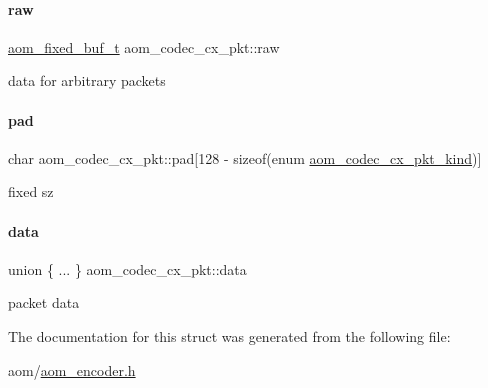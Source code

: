 \paragraph{\texorpdfstring{raw}{raw}}
{\footnotesize\ttfamily \hyperlink{group__encoder_ga85cca9fad6bc25c667f013a39c607174}{aom\+\_\+fixed\+\_\+buf\+\_\+t} aom\+\_\+codec\+\_\+cx\+\_\+pkt\+::raw}

data for arbitrary packets \mbox{\label{structaom__codec__cx__pkt_a96b7e6cac7b6952edaba7e38733a6c4e}} 
\paragraph{\texorpdfstring{pad}{pad}}
{\footnotesize\ttfamily char aom\+\_\+codec\+\_\+cx\+\_\+pkt\+::pad\mbox{[}128 -\/ sizeof(enum \hyperlink{group__encoder_gafeb69da4a9649a54e805f59c26d8dfed}{aom\+\_\+codec\+\_\+cx\+\_\+pkt\+\_\+kind})\mbox{]}}

fixed sz \mbox{\label{structaom__codec__cx__pkt_afb379cd4bfa7692d1d6e85f4e4b2b410}} 
\paragraph{\texorpdfstring{data}{data}}
{\footnotesize\ttfamily union \{ ... \}   aom\+\_\+codec\+\_\+cx\+\_\+pkt\+::data}

packet data 

The documentation for this struct was generated from the following file\+:\begin{DoxyCompactItemize}
\item 
aom/\hyperlink{aom__encoder_8h}{aom\+\_\+encoder.\+h}\end{DoxyCompactItemize}
